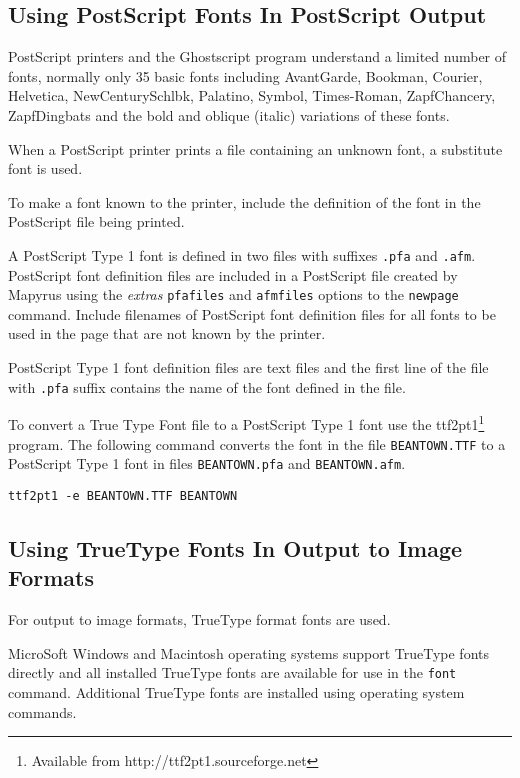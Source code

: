 \subsection{Using PostScript Fonts In PostScript Output}
\label{psfonts}

PostScript printers and the Ghostscript program
understand a limited number of fonts,
normally only 35 basic fonts including
AvantGarde,
Bookman,
Courier,
Helvetica,
NewCenturySchlbk,
Palatino,
Symbol,
Times-Roman,
ZapfChancery,
ZapfDingbats
and the bold
and oblique (italic) variations of these fonts.

When a PostScript printer prints a file containing an unknown font,
a substitute font is used.

To make a font known to the printer, include the definition of
the font in the PostScript file being printed.

A PostScript Type 1 font is defined in two files with suffixes
\texttt{.pfa} and \texttt{.afm}.  PostScript
font definition files are included in a PostScript file created
by Mapyrus using the
\textit{extras} \texttt{pfafiles} and \texttt{afmfiles}
options to the \texttt{newpage} command.
Include filenames of PostScript font definition files for all fonts to be used
in the page that are not known by the printer.

PostScript Type 1 font definition files are text files and
the first line of the file with \texttt{.pfa} suffix
contains the name of the font defined in the file.

To convert a True Type Font file to a PostScript Type 1 font use the
ttf2pt1\footnote{Available from http://ttf2pt1.sourceforge.net} program.  The
following command converts the font in the file \texttt{BEANTOWN.TTF} to a
PostScript Type 1 font in files
\texttt{BEANTOWN.pfa} and
\texttt{BEANTOWN.afm}.

\begin{verbatim}
ttf2pt1 -e BEANTOWN.TTF BEANTOWN
\end{verbatim}

\subsection{Using TrueType Fonts In Output to Image Formats}
\label{ttffonts}

For output to image formats, TrueType format fonts are used.

MicroSoft Windows and Macintosh operating systems support TrueType
fonts directly and all installed TrueType fonts are available
for use in the \texttt{font} command.
Additional TrueType fonts are installed using operating system commands.

